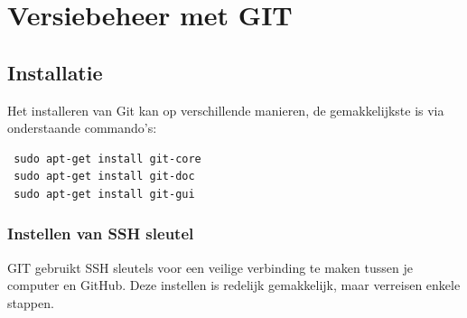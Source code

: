 \documentclass[12pt]{article} %
\begin{document}
\newpage
\section{Versiebeheer met GIT} \label{sec:Versiebeheer met GIT}

\subsection{Installatie} \label{sec:Installatie}

Het installeren van Git kan op verschillende manieren, de gemakkelijkste is via onderstaande commando's:
\begin{lstlisting}
 sudo apt-get install git-core
 sudo apt-get install git-doc
 sudo apt-get install git-gui
\end{lstlisting}
\subsubsection{Instellen van SSH sleutel} \label{sec:Instellen van SSH sleutel}

GIT gebruikt SSH sleutels voor een veilige verbinding te maken tussen je computer en GitHub. Deze instellen is redelijk gemakkelijk, maar verreisen enkele stappen.
\end{document}

